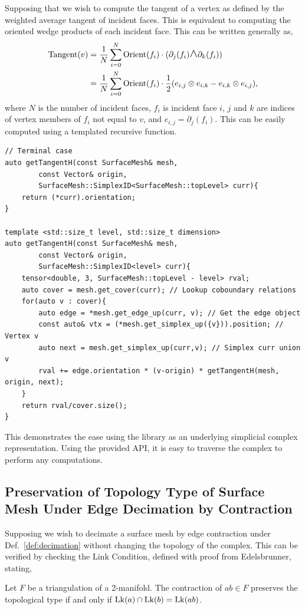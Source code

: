 \par Supposing that we wish to compute the tangent of a vertex as defined by the weighted average tangent of incident faces. This is equivalent to computing the oriented wedge products of each incident face. This can be written generally as,
\begin{align}
	\operatorname{Tangent}(v) & = \frac{1}{N}\sum_{i=0}^{N} \operatorname{Orient}(f_i)\cdot(\partial_{j}(f_i)\mbox{\Large $\wedge$} \partial_{k}(f_i))\\
	& = \frac{1}{N}\sum_{i=0}^{N} \operatorname{Orient}(f_i)\cdot \frac{1}{2}(e_{i,j}\otimes e_{i,k} - e_{i,k}\otimes e_{i,j}),
\end{align}
where $N$ is the number of incident faces, $f_i$ is incident face $i$, $j$ and $k$ are indices of vertex members of $f_i$ not equal to $v$, and $e_{i,j} = \partial_{j}(f_i)$. This can be easily computed using a templated recursive function.
\begin{lstlisting}
// Terminal case
auto getTangentH(const SurfaceMesh& mesh,
		const Vector& origin,
		SurfaceMesh::SimplexID<SurfaceMesh::topLevel> curr){
    return (*curr).orientation;
}

template <std::size_t level, std::size_t dimension>
auto getTangentH(const SurfaceMesh& mesh,
		const Vector& origin,
		SurfaceMesh::SimplexID<level> curr){
    tensor<double, 3, SurfaceMesh::topLevel - level> rval;
    auto cover = mesh.get_cover(curr); // Lookup coboundary relations
    for(auto v : cover){
        auto edge = *mesh.get_edge_up(curr, v); // Get the edge object
        const auto& vtx = (*mesh.get_simplex_up({v})).position; // Vertex v
        auto next = mesh.get_simplex_up(curr,v); // Simplex curr union v
        rval += edge.orientation * (v-origin) * getTangentH(mesh, origin, next);
    }
    return rval/cover.size();
}
\end{lstlisting}
This demonstrates the ease using the \asc library as an underlying simplicial complex representation. Using the provided API, it is easy to traverse the complex to perform any computations.

\subsection{Preservation of Topology Type of Surface Mesh Under Edge Decimation by Contraction}\label{sec:preservingtopology}

    \par Supposing we wish to decimate a surface mesh by edge contraction under Def.~\ref{def:decimation} without changing the topology of the complex.
    This can be verified by checking the Link Condition, defined with proof from Edelsbrunner\cite{Edelsbrunner2001}, stating,
    \begin{lemma}
        Let $F$ be a triangulation of a 2-manifold. The contraction of $ab\in F$ preserves the topological type if and only if $\operatorname{Lk}(a)\cap\operatorname{Lk}(b) = \operatorname{Lk}(ab)$.
        \label{lemma:linkcondition}
    \end{lemma}

